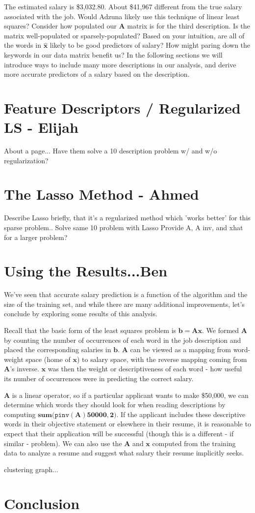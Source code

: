 \documentclass[12pt]{article}
\begin{document}
    The estimated salary is \$3,032.80. About \$41,967 different from the true
    salary associated with the job. Would Adzuna likely use this technique of
    linear least squares? Consider how populated our $\bm{A}$ matrix is for the
    third description. Is the matrix well-populated or sparsely-populated?
    Based on your intuition, are all of the words in $\bm{\hat{x}}$ likely to
    be good predictors of salary? How might paring down the keywords in our
    data matrix benefit us? In the following sections we will introduce ways to
    include many more descriptions in our analysis, and derive more accurate
    predictors of a salary based on the description.

\section{Feature Descriptors / Regularized LS - Elijah}
About a page...
Have them solve a 10 description problem w/ and w/o regularization?

\section{The Lasso Method - Ahmed}
Describe Lasso briefly, that it's a regularized method which 'works better' for this sparse problem..
Solve same 10 problem with Lasso
Provide A, A inv, and xhat for a larger problem?

\section{Using the Results...Ben}
We've seen that accurate salary prediction is a function of the algorithm and the size of the training set, and while there are many additional improvements, let's conclude by exploring some results of this analysis.

Recall that the basic form of the least squares problem is $\bm{b = Ax}$.
We formed $\bm{A}$ by counting the number of occurrences of each word in the job description and placed the corresponding salaries in $\bm{b}$.
$\bm{A}$ can be viewed as a mapping from word-weight space (home of $\bm{x}$) to salary space, with the reverse mapping coming from $\bm{A}$'s inverse.
$\bm{x}$ was then the weight or descriptiveness of each word - how useful its number of occurrences were in predicting the correct salary.

$\bm{A}$ is a linear operator, so if a particular applicant wants to make \$50,000, we can determine which words they should look for when reading descriptions by computing $\bm{sum(}\texttt{pinv}\bm{(A)50000,2)}$.
If the applicant includes these descriptive words in their objective statement or elsewhere in their resume, it is reasonable to expect that their application will be successful (though this is a different - if similar - problem).
We can also use the $\bm{A}$ and $\bm{x}$ computed from the training data to analyze a resume and suggest what salary their resume implicitly seeks.

clustering graph...



\section{Conclusion}
\end{document}
